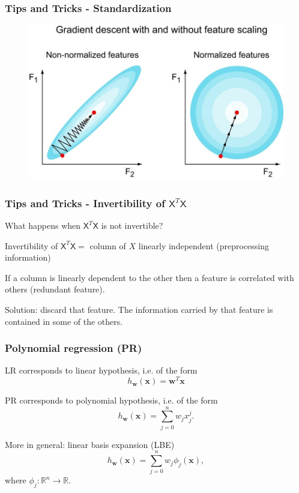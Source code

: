 \documentclass{beamer}
\begin{document}
	\begin{frame}
		\frametitle{Tips and Tricks - Standardization}
		\begin{figure}
			\centering
			\includegraphics[scale=0.35]{images/feature-scaling}
		\end{figure}

		
	\end{frame}

	\begin{frame}
		\frametitle{Tips and Tricks - Invertibility of $\mathsf{X}^T\mathsf{X}$}
		What happens when $\mathsf{X}^T\mathsf{X}$ is not invertible?
		
		Invertibility of $\mathsf{X}^T\mathsf{X} =$ column of $X$ linearly independent (preprocessing information)
		
		\vspace{5mm}
		
		If a column is linearly dependent to the other then a feature is correlated with others (redundant feature).
		
		\vspace{5mm}
		
		Solution: discard that feature. The information carried by that feature is contained in some of the others. 
	\end{frame}

	\begin{frame}
		\frametitle{Polynomial regression (PR)}
		LR corresponds to linear hypothesis, i.e. of the form
		\begin{equation*}
			h_{\bm{w}}(\bm{x}) = \bm{w}^T \bm{x}
		\end{equation*}
		
		\vspace{5mm}
		
		PR corresponds to polynomial hypothesis, i.e. of the form
		\begin{equation*}
			h_{\bm{w}}(\bm{x}) = \sum_{j=0}^n w_j x^j_j.
		\end{equation*}
		
		\vspace{5mm}
		More in general: linear basis expansion (LBE)
		\begin{equation*}
			h_{\bm{w}}(\bm{x}) = \sum_{j=0}^n w_j \phi_j(\bm{x}),
		\end{equation*}
		where $\phi_j: \mathbb{R}^n \rightarrow \mathbb{R}$.
	\end{frame}
\end{document}

